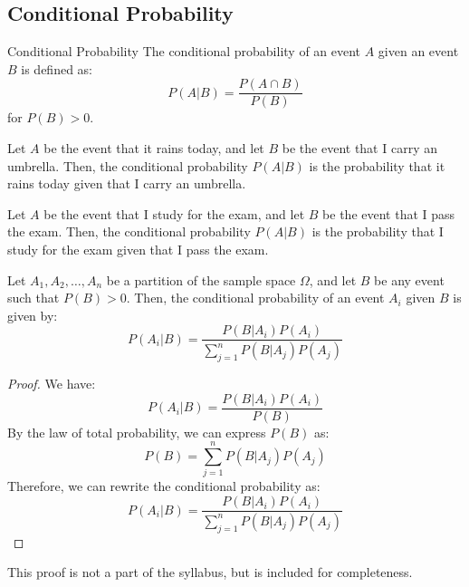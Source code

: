 \documentclass[openany]{book}
\begin{document}
\subsection{Conditional Probability}
\begin{mydefinition}{Conditional Probability}
    The conditional probability of an event $A$ given an event $B$ is defined as:
    $$P(A|B) = \frac{P(A \cap B)}{P(B)}$$
    for $P(B) > 0$.
\end{mydefinition}
\begin{example}
    Let $A$ be the event that it rains today, and let $B$ be the event that I carry an umbrella. Then, the conditional probability $P(A|B)$ is the probability that it rains today given that I carry an umbrella.
\end{example}
\begin{example}
    Let $A$ be the event that I study for the exam, and let $B$ be the event that I pass the exam. Then, the conditional probability $P(A|B)$ is the probability that I study for the exam given that I pass the exam.
\end{example}
\begin{mytheorem}
    Let $A_1, A_2, \ldots, A_n$ be a partition of the sample space $\Omega$, and let $B$ be any event such that $P(B) > 0$. Then, the conditional probability of an event $A_i$ given $B$ is given by:
    $$P(A_i|B) = \frac{P(B|A_i)P(A_i)}{\sum_{j=1}^{n} P(B|A_j)P(A_j)}$$
\end{mytheorem}
\begin{proof}
    We have:
    $$P(A_i|B) = \frac{P(B|A_i)P(A_i)}{P(B)}$$
    By the law of total probability, we can express $P(B)$ as:
    $$P(B) = \sum_{j=1}^{n} P(B|A_j)P(A_j)$$
    Therefore, we can rewrite the conditional probability as:
    $$P(A_i|B) = \frac{P(B|A_i)P(A_i)}{\sum_{j=1}^{n} P(B|A_j)P(A_j)}$$
\end{proof}
\begin{mynote}
This proof is not a part of the syllabus, but is included for completeness.
\end{mynote}
\end{document}

